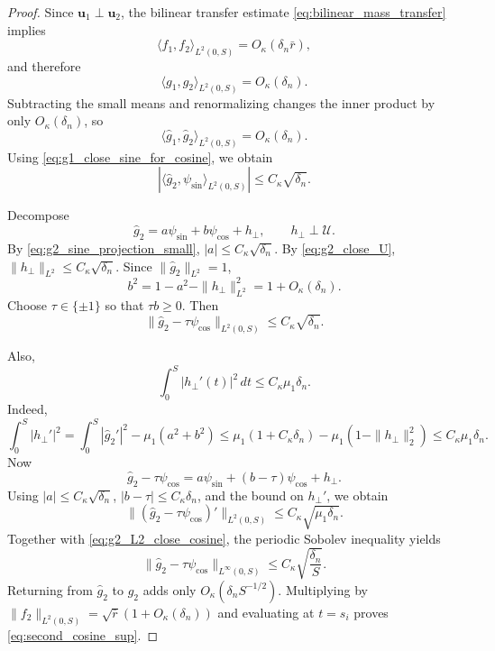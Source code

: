 \documentclass[11pt]{article}
\numberwithin{equation}{section}
\theoremstyle{definition}
\theoremstyle{remark}
\begin{document}
\begin{proof}
	Since $\boldsymbol{u}_1\perp \boldsymbol{u}_2$, the bilinear transfer
	estimate \eqref{eq:bilinear_mass_transfer} implies
	\[
	\langle f_1,f_2\rangle_{L^2(0,S)}=O_\kappa(\delta_n\bar r),
	\]
	and therefore
	\[
	\langle g_1,g_2\rangle_{L^2(0,S)}=O_\kappa(\delta_n).
	\]
	Subtracting the small means and renormalizing changes the inner product by
	only $O_\kappa(\delta_n)$, so
	\[
	\langle \widehat g_1,\widehat g_2\rangle_{L^2(0,S)}
	=
	O_\kappa(\delta_n).
	\]
	Using \eqref{eq:g1_close_sine_for_cosine}, we obtain
	\begin{equation}\label{eq:g2_sine_projection_small}
		\left|
		\langle \widehat g_2,\psi_{\sin}\rangle_{L^2(0,S)}
		\right|
		\le
		C_\kappa\sqrt{\delta_n}.
	\end{equation}
	
	Decompose
	\[
	\widehat g_2=a\psi_{\sin}+b\psi_{\cos}+h_\perp,
	\qquad h_\perp\perp \mathcal U.
	\]
	By \eqref{eq:g2_sine_projection_small}, $|a|\le C_\kappa\sqrt{\delta_n}$.
	By \eqref{eq:g2_close_U}, $\|h_\perp\|_{L^2}\le C_\kappa\sqrt{\delta_n}$.
	Since $\|\widehat g_2\|_{L^2}=1$,
	\[
	b^2=1-a^2-\|h_\perp\|_{L^2}^2=1+O_\kappa(\delta_n).
	\]
	Choose $\tau\in\{\pm1\}$ so that $\tau b\ge 0$. Then
	\begin{equation}\label{eq:g2_L2_close_cosine}
		\|\widehat g_2-\tau\psi_{\cos}\|_{L^2(0,S)}
		\le C_\kappa\sqrt{\delta_n}.
	\end{equation}
	
	Also,
	\[
	\int_0^S|h_\perp'(t)|^2\,dt
	\le C_\kappa\mu_1\delta_n.
	\]
	Indeed,
	\[
	\int_0^S|h_\perp'|^2
	=
	\int_0^S|\widehat g_2'|^2-\mu_1(a^2+b^2)
	\le
	\mu_1(1+C_\kappa\delta_n)-\mu_1(1-\|h_\perp\|_2^2)
	\le
	C_\kappa\mu_1\delta_n.
	\]
	Now
	\[
	\widehat g_2-\tau\psi_{\cos}
	=
	a\psi_{\sin}+(b-\tau)\psi_{\cos}+h_\perp.
	\]
	Using $|a|\le C_\kappa\sqrt{\delta_n}$, $|b-\tau|\le C_\kappa\delta_n$,
	and the bound on $h_\perp'$, we obtain
	\[
	\|(\widehat g_2-\tau\psi_{\cos})'\|_{L^2(0,S)}
	\le
	C_\kappa\sqrt{\mu_1\delta_n}.
	\]
	Together with \eqref{eq:g2_L2_close_cosine}, the periodic Sobolev
	inequality yields
	\[
	\|\widehat g_2-\tau\psi_{\cos}\|_{L^\infty(0,S)}
	\le
	C_\kappa\sqrt{\frac{\delta_n}{S}}.
	\]
	Returning from $\widehat g_2$ to $g_2$ adds only
	$O_\kappa(\delta_n S^{-1/2})$. Multiplying by
	$\|f_2\|_{L^2(0,S)}=\sqrt{\bar r}(1+O_\kappa(\delta_n))$ and evaluating
	at $t=s_i$ proves \eqref{eq:second_cosine_sup}.
\end{proof}
\end{document}
